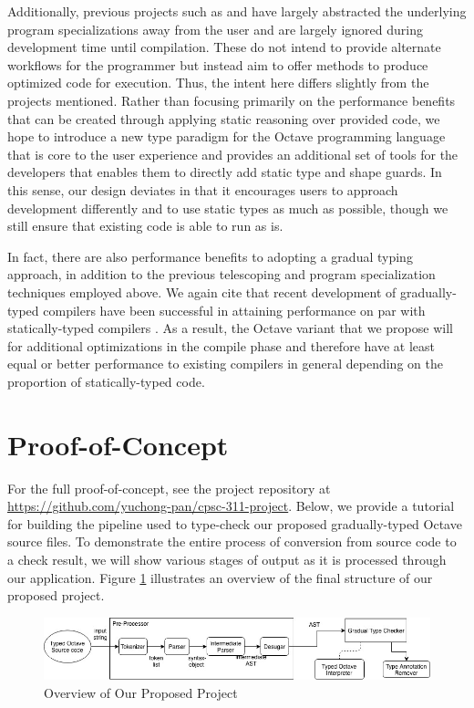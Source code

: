 Additionally, previous projects such as \citet{chauhan2003type} and \citet{olmos2003turning} have largely abstracted the underlying program specializations away from the user and are largely ignored during development time until compilation. These do not intend to provide alternate workflows for the programmer but instead aim to offer methods to produce optimized code for execution. Thus, the intent here differs slightly from the projects mentioned. Rather than focusing primarily on the performance benefits that can be created through applying static reasoning over provided code, we hope to introduce a new type paradigm for the Octave programming language that is core to the user experience and provides an additional set of tools for the developers that enables them to directly add static type and shape guards. In this sense, our design deviates in that it encourages users to approach development differently and to use static types as much as possible, though we still ensure that existing code is able to run as is.

In fact, there are also performance benefits to adopting a gradual typing approach, in addition to the previous telescoping and program specialization techniques employed above. We again cite that recent development of gradually-typed compilers have been successful in attaining performance on par with statically-typed compilers \cite{kuhlenschmidt2018efficient}. As a result, the Octave variant that we propose will for additional optimizations in the compile phase and therefore have at least equal or better performance to existing compilers in general depending on the proportion of statically-typed code.

\section{Proof-of-Concept}
For the full proof-of-concept, see the project repository at \url{https://github.com/yuchong-pan/cpsc-311-project}. Below, we provide a tutorial for building the pipeline used to type-check our proposed gradually-typed Octave source files. To demonstrate the entire process of conversion from source code to a check result, we will show various stages of output as it is processed through our application. Figure \ref{fig:overview} illustrates an overview of the final structure of our proposed project.

\begin{figure}[h]
    \centering
    \includegraphics[width=.5\textwidth]{overview.jpg}
    \caption{Overview of Our Proposed Project}
    \label{fig:overview}
\end{figure}

